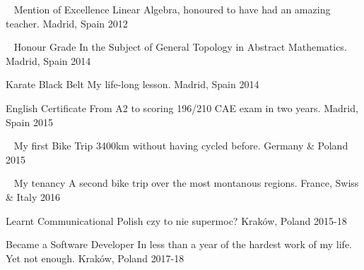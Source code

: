 
\begin{cvhonors}

	\cvhonor
	{\faUniversity \,\,\, Mention of Excellence} %
	{Linear Algebra, honoured to have had an amazing teacher.} %
	{Madrid, Spain} %
	{2012} %
	
	\cvhonor
	{\faUniversity \,\,\, Honour Grade} %
	{In the Subject of General Topology in Abstract Mathematics.} %
	{Madrid, Spain} %
	{2014} %
	
  \cvhonor
    {\faTrophy \quad Karate Black Belt} %
    {My life-long lesson.} %
    {Madrid, Spain} %
    {2014} %

  \cvhonor
    {\faCertificate \quad English Certificate} %
    {From A2 to scoring 196/210 CAE exam in two years.} %
    {Madrid, Spain} %
    {2015} %

  \cvhonor
    {\faBicycle \,\,\, My first Bike Trip} %
    {3400km without having cycled before.} %
    {Germany \& Poland} %
    {2015} %

  \cvhonor
    {\faBicycle \,\,\, My tenancy} %
    {A second bike trip over the most montanous regions.} %
    {France, Swiss \& Italy} %
    {2016} %

\cvhonor
	{\faLanguage \quad Learnt Communicational Polish} %
	{czy to nie supermoc?} %
	{Kraków, Poland} %
	{2015-18} %

  \cvhonor
    {\faLanguage \quad Became a Software Developer} %
    {In less than a year of the hardest work of my life. Yet not enough.} %
    {Kraków, Poland} %
    {2017-18} %

\end{cvhonors}
